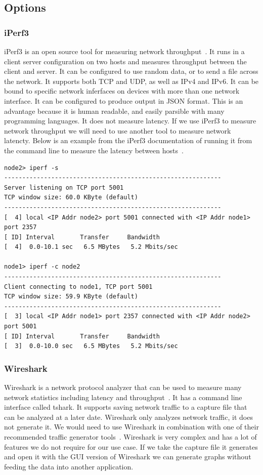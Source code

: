 \documentclass[10pt,letterpaper,onecolumn,draftclsnofoot]{IEEEtran}
\begin{document}
\subsection{Options}

\subsubsection{iPerf3}
iPerf3 is an open source tool for measuring network throughput~\cite{iperf}.
It runs in a client server configuration on two hosts and measures throughput between the client and server.
It can be configured to use random data, or to send a file across the network.
It supports both TCP and UDP, as well as IPv4 and IPv6.
It can be bound to specific network inferfaces on devices with more than one network interface.
It can be configured to produce output in JSON format. 
This is an advantage because it is human readable, and easily parsible with many programming languages.
It does not measure latency. 
If we use iPerf3 to measure network throughput we will need to use another tool to measure network latencty.
Below is an example from the iPerf3 documentation of running it from the command line to measure the latency between hosts~\cite{iperf}.
\begin{lstlisting}[caption = Sample iPerf 3 usage]
node2> iperf -s
------------------------------------------------------------
Server listening on TCP port 5001
TCP window size: 60.0 KByte (default)
------------------------------------------------------------
[  4] local <IP Addr node2> port 5001 connected with <IP Addr node1> port 2357
[ ID] Interval       Transfer     Bandwidth
[  4]  0.0-10.1 sec   6.5 MBytes   5.2 Mbits/sec

node1> iperf -c node2
------------------------------------------------------------
Client connecting to node1, TCP port 5001
TCP window size: 59.9 KByte (default)
------------------------------------------------------------
[  3] local <IP Addr node1> port 2357 connected with <IP Addr node2> port 5001
[ ID] Interval       Transfer     Bandwidth
[  3]  0.0-10.0 sec   6.5 MBytes   5.2 Mbits/sec
\end{lstlisting}


\subsubsection{Wireshark}
Wireshark is a network protocol analyzer that can be used to measure many network statistics including latency and throughput~\cite{wireshark}. 
It has a command line interface called tshark.
It supports saving network traffic to a capture file that can be analyzed at a later date.
Wireshark only analyzes network traffic, it does not generate it.
We would need to use Wireshark in combination with one of their recommended traffic generator tools~\cite{wireshark-tools}.
Wireshark is very complex and has a lot of features we do not require for our use case.
If we take the capture file it generates and open it with the GUI version of Wireshark we can generate graphs without feeding the data into another application.
\end{document}
